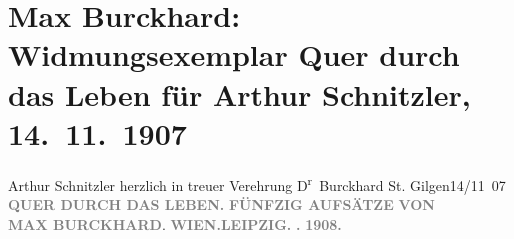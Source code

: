 

         
         \renewcommand{\erwaehntePersonen}{Personen: Max Eugen Burckhard}
         \renewcommand{\erwaehnteInstitutionen}{Institutionen: F. Tempsky, G. Freytag}
         \renewcommand{\erwaehnteOrte}{Orte: Leipzig, St. Gilgen, Wien}
         \renewcommand{\erwaehnteWerke}{Werke: Quer durch das Leben. Fünfzig Aufsätze}
               \section[Max Burckhard: Widmungsexemplar Quer durch das Leben für Arthur Schnitzler, 14. 11. 1907]{ Max Burckhard: Widmungsexemplar Quer durch das Leben für Arthur
               Schnitzler, 14. 11. 1907}\nopagebreak{}\rehead{ }\begin{ledgroupsized}[t]{13cm}\normalsize\beginnumbering \toendnotes[C]{\smallbreak\pagebreak[2]} 
\pstart
           \noindent{}{\pb}Arthur Schnitzler herzlich in treuer
               Verehrung\pend
           \pstart \spacefill\mbox{D\textsuperscript{r} Burckhard}\pend{}\pstart
           St. Gilgen14/11 07\pend
           {\bigskip}\pstart
           \noindent{}\centering{}\textcolor{gray}{\textbf{QUER DURCH DAS LEBEN.}}\pend
           \pstart
           \noindent{}\centering{}\textcolor{gray}{\textbf{FÜNFZIG AUFSÄTZE}}\pend
           \pstart
           \noindent{}\centering{}\textcolor{gray}{\textbf{VON}}{\\}\textcolor{gray}{\textbf{MAX BURCKHARD}}.\pend
           {\bigskip}\pstart
           \noindent{}\textcolor{gray}{\textbf{WIEN.}}\hfill \textcolor{gray}{\textbf{LEIPZIG.}}\pend
           \pstart
           \textcolor{gray}{\textbf{.}}\hfill \textcolor{gray}{\textbf{}}\pend
           \pstart
           \centering{}\textcolor{gray}{\textbf{1908.}}\pend
           
         
         \endnumbering{}\end{ledgroupsized}  \newcommand{\dateiname}{L01730}\newcommand{\titel}{Max Burckhard: Widmungsexemplar Quer durch das Leben für Arthur Schnitzler, 14. 11. 1907}\newcommand{\editorInnen}{Martin Anton Müller und Gerd-Hermann Susen}
      